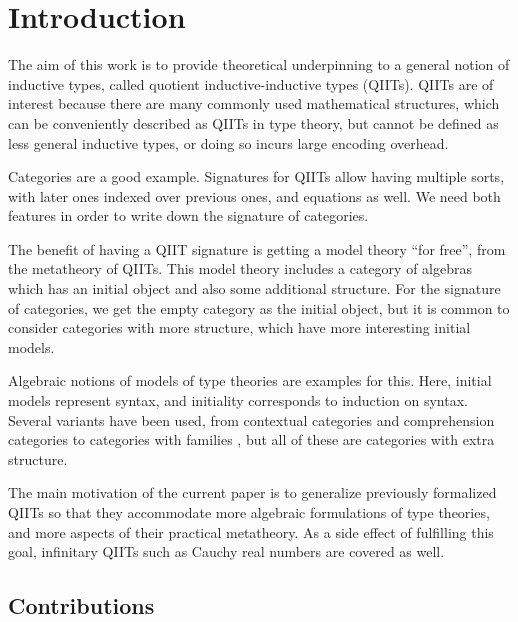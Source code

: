 \documentclass[sigplan,review,anonymous]{acmart}\settopmatter{printfolios=true,printccs=false,printacmref=false}
\begin{document}
\section{Introduction}

The aim of this work is to provide theoretical underpinning to a general notion
of inductive types, called quotient inductive-inductive types (QIITs). QIITs are
of interest because there are many commonly used mathematical structures, which
can be conveniently described as QIITs in type theory, but cannot be defined as
less general inductive types, or doing so incurs large encoding overhead.

Categories are a good example. Signatures for QIITs allow having multiple sorts,
with later ones indexed over previous ones, and equations as well. We need both
features in order to write down the signature of categories.

The benefit of having a QIIT signature is getting a model theory ``for free'',
from the metatheory of QIITs. This model theory includes a category of algebras
which has an initial object and also some additional structure. For the
signature of categories, we get the empty category as the initial object, but it
is common to consider categories with more structure, which have more
interesting initial models.

Algebraic notions of models of type theories are examples for this. Here,
initial models represent syntax, and initiality corresponds to induction on
syntax. Several variants have been used, from contextual categories \cite{TODO} and
comprehension categories \cite{TODO} to categories with families \cite{TODO}, but all of these are
categories with extra structure.

The main motivation of the current paper is to generalize previously formalized
\cite{kaposi2019constructing} QIITs so that they accommodate more algebraic
formulations of type theories, and more aspects of their practical
metatheory. As a side effect of fulfilling this goal, infinitary QIITs such as
Cauchy real numbers \cite{TODO} are covered as well.

\subsection{Contributions}
\end{document}
